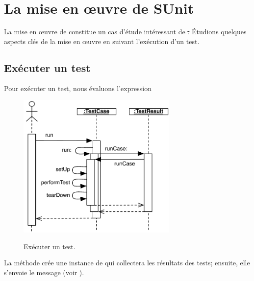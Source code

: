 \documentclass[a4paper,10pt,twoside]{book}
\begin{document}
\section{La mise en {\oe}uvre de SUnit}

La mise en {\oe}uvre de \sunit constitue un cas d'étude intéressant de  \st.
\'Etudions quelques aspects clés de la mise en {\oe}uvre en suivant l'exécution d'un test.
\subsection{Exécuter un test}

Pour exécuter un test, nous évaluons l'expression 

\begin{figure}[tbh]
  \begin{center} 
		{\includegraphics[width=0.7\textwidth]{sunit-scenario}}
	\caption{Exécuter un test.}
  \end{center}
\end{figure}

La méthode  crée une instance de  qui collectera les résultats des tests; ensuite, elle s'envoie le message 
(voir ).
\end{document}
